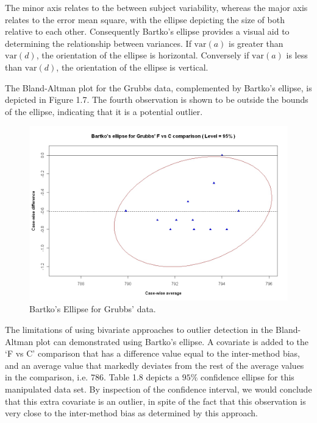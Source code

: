 \documentclass[12pt, a4paper]{report}
\theoremstyle{plain}
\theoremstyle{definition}
\theoremstyle{remark}
\begin{document}
The minor axis relates to the between subject variability, whereas
the major axis relates to the error mean square, with the ellipse
depicting the size of both relative to each other.
Consequently Bartko's ellipse provides a visual aid to determining the
relationship between variances. If $\mbox{var}(a)$ is greater than $\mbox{var}(d)$, the orientation of the ellipse is horizontal. Conversely if $\mbox{var}(a)$ is less than $\mbox{var}(d)$, the orientation of the ellipse is vertical.


	
	
	
	The Bland-Altman plot for the Grubbs data, complemented by Bartko's ellipse, is depicted in Figure 1.7.
	The fourth observation is shown to be outside the bounds of the ellipse, indicating that it is a potential outlier.
	
	
	\begin{figure}[h!]
		\includegraphics[width=130mm]{images/GrubbsBartko.jpeg}
		\caption{Bartko's Ellipse for Grubbs' data.}\label{GrubbsBartko}
	\end{figure}
	
	The limitations of using bivariate approaches to outlier detection
	in the Bland-Altman plot can demonstrated using Bartko's ellipse.
	A covariate is added to the `F vs C' comparison that has a
	difference value equal to the inter-method bias, and an average
	value that markedly deviates from the rest of the average values
	in the comparison, i.e. 786. Table 1.8 depicts a $95\%$ confidence
	ellipse for this manipulated data set. By inspection of the
	confidence interval, we would conclude that this extra
	covariate is an outlier, in spite of the fact that this
	observation is very close to the inter-method bias as determined by this approach.
	
\end{document}
